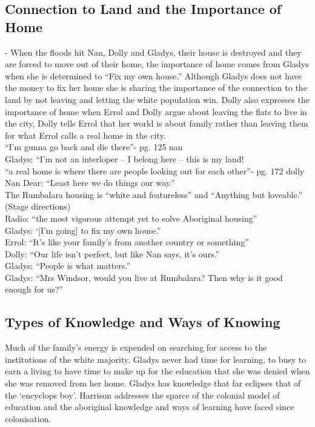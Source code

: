 \documentclass[a4paper]{article}
\begin{document}
\subsection{Connection to Land and the Importance of Home}
- When the floods hit Nan, Dolly and Gladys, their house is destroyed and they are forced to move out of their home, the importance of home comes from Gladys when she is determined to “Fix my own house.” Although Gladys does not have the money to fix her home she is sharing the importance of the connection to the land by not leaving and letting the white population win. Dolly also expresses the importance of home when Errol and Dolly argue about leaving the flats to live in the city, Dolly tells Errol that her world is about family rather than leaving them for what Errol calls a real home in the city. \\

“I'm gunna go back and die there”- pg. 125 nan \\
Gladys: “I’m not an interloper – I belong here – this is my land! \\
“a real home is where there are people looking out for each other”- pg. 172 dolly \\
Nan Dear: “Least here we do things our way.” \\
The Rumbalara housing is “white and featureless” and “Anything but loveable.” (Stage directions) \\
Radio: “the most vigorous attempt yet to solve Aboriginal housing” \\
Gladys: ‘[I’m going] to fix my own house.” \\
Errol: “It’s like your family’s from another country or something” \\
Dolly: “Our life isn’t perfect, but like Nan says, it’s ours.” \\
Gladys: “People is what matters.” \\
Gladys: “Mrs Windsor, would you live at Rumbalara? Then why is it good enough for us?” \\

\subsection{Types of Knowledge and Ways of Knowing}
Much of the family’s energy is expended on searching for access to the institutions of the white majority. Gladys never had time for learning, to busy to earn a living to have time to make up for the education that she was denied when she was removed from her home. Gladys has knowledge that far eclipses that of the ‘encyclops boy’. Harrison addresses the sparce of the colonial model of education and the aboriginal knowledge and ways of learning have faced since colonisation. \\
\end{document}
